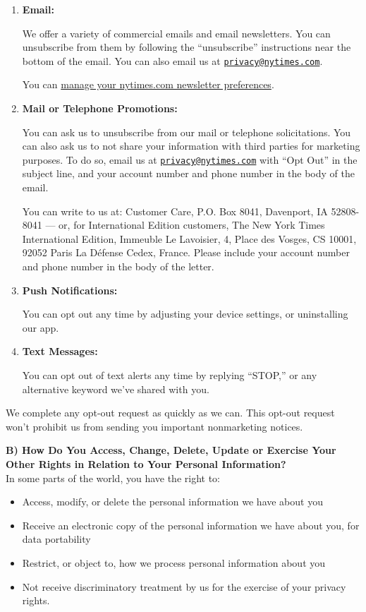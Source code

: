 \begin{enumerate}
\def\labelenumi{\arabic{enumi}.}
\item
  \textbf{Email:}

  We offer a variety of commercial emails and email newsletters. You can
  unsubscribe from them by following the ``unsubscribe'' instructions
  near the bottom of the email. You can also email us at
  \href{mailto:privacy@nytimes.com}{\nolinkurl{privacy@nytimes.com}}.

  You can \href{https://myaccount.nytimes.com/seg/settings}{manage your
  nytimes.com newsletter preferences}.
\item
  \textbf{Mail or Telephone Promotions:}

  You can ask us to unsubscribe from our mail or telephone
  solicitations. You can also ask us to not share your information with
  third parties for marketing purposes. To do so, email us at
  \href{mailto:privacy@nytimes.com}{\nolinkurl{privacy@nytimes.com}}
  with ``Opt Out'' in the subject line, and your account number and
  phone number in the body of the email.

  You can write to us at: Customer Care, P.O. Box 8041, Davenport, IA
  52808-8041 --- or, for International Edition customers, The New York
  Times International Edition, Immeuble Le Lavoisier, 4, Place des
  Vosges, CS 10001, 92052 Paris La Défense Cedex, France. Please include
  your account number and phone number in the body of the letter.
\item
  \textbf{Push Notifications:}

  You can opt out any time by adjusting your device settings, or
  uninstalling our app.
\item
  \textbf{Text Messages:}

  You can opt out of text alerts any time by replying ``STOP,'' or any
  alternative keyword we've shared with you.
\end{enumerate}

We complete any opt-out request as quickly as we can. This opt-out
request won't prohibit us from sending you important nonmarketing
notices.

\textbf{B) How Do You Access, Change, Delete, Update or Exercise Your
Other Rights in Relation to Your Personal Information?}\\
In some parts of the world, you have the right to:

\begin{itemize}
\tightlist
\item
  Access, modify, or delete the personal information we have about you
\item
  Receive an electronic copy of the personal information we have about
  you, for data portability
\item
  Restrict, or object to, how we process personal information about you
\item
  Not receive discriminatory treatment by us for the exercise of your
  privacy rights.
\end{itemize}

